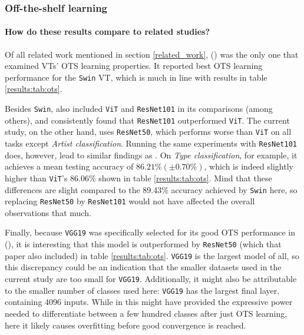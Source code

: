 \subsubsection{Off-the-shelf learning}

\paragraph{How do these results compare to related studies?}
Of all related work mentioned in section \ref{related_work}, \citeauthor{zhou2021convnets} (\citeyear{zhou2021convnets}) was the only one that examined VTs' OTS learning properties. It reported best OTS learning performance for the \texttt{Swin} VT, which is much in line with results in table \ref{results:tab:ots}.

Besides \texttt{Swin}, \citeauthor{zhou2021convnets} also included \texttt{ViT} and \texttt{ResNet101} in its comparisons (among others), and consistently found that \texttt{ResNet101} outperformed \texttt{ViT}. The current study, on the other hand, uses \texttt{ResNet50}, which performs worse than \texttt{ViT} on all tasks except \textit{Artist classification}. Running the same experiments with \texttt{ResNet101} does, however, lead to similar findings as \citeauthor{zhou2021convnets}. On \textit{Type classification}, for example, it achieves a mean testing accuracy of  $86.21\% (\pm 0.70\%)$, which is indeed slightly higher than \texttt{ViT}'s 86.06\% shown in table \ref{results:tab:ots}. Mind that these differences are slight compared to the 89.43\% accuracy achieved by \texttt{Swin} here, so replacing \texttt{ResNet50} by \texttt{ResNet101} would not have affected the overall observations that much.

Finally, because \texttt{VGG19} was specifically selected for its good OTS performance in \citeauthor{sabatelli2018deep} (\citeyear{sabatelli2018deep}), it is interesting that this model is outperformed by \texttt{ResNet50} (which that paper also included) in table \ref{results:tab:ots}. \texttt{VGG19} is the largest model of all, so this discrepancy could be an indication that the smaller datasets used in the current study are too small for \texttt{VGG19}. Additionally, it might also be attributable to the smaller number of classes used here: \texttt{VGG19} has the largest final layer, containing 4096 inputs. While in \citeauthor{sabatelli2018deep} this might have provided the expressive power needed to differentiate between a few hundred classes after just OTS learning, here it likely causes overfitting before good convergence is reached.

